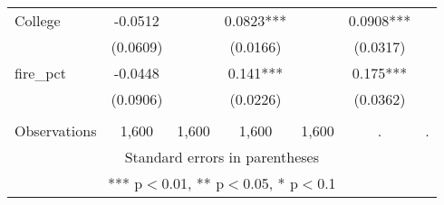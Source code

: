 \begin{tabular}{lcccccc}
College & -0.0512 &  & 0.0823*** &  & 0.0908*** &  \\
 & (0.0609) &  & (0.0166) &  & (0.0317) &  \\
fire\_pct & -0.0448 &  & 0.141*** &  & 0.175*** &  \\
 & (0.0906) &  & (0.0226) &  & (0.0362) &  \\
 &  &  &  &  &  &  \\
 Observations & 1,600 & 1,600 & 1,600 & 1,600 & . & . \\ \hline
\multicolumn{7}{c}{ Standard errors in parentheses} \\
\multicolumn{7}{c}{ *** p$<$0.01, ** p$<$0.05, * p$<$0.1} \\
\end{tabular}
